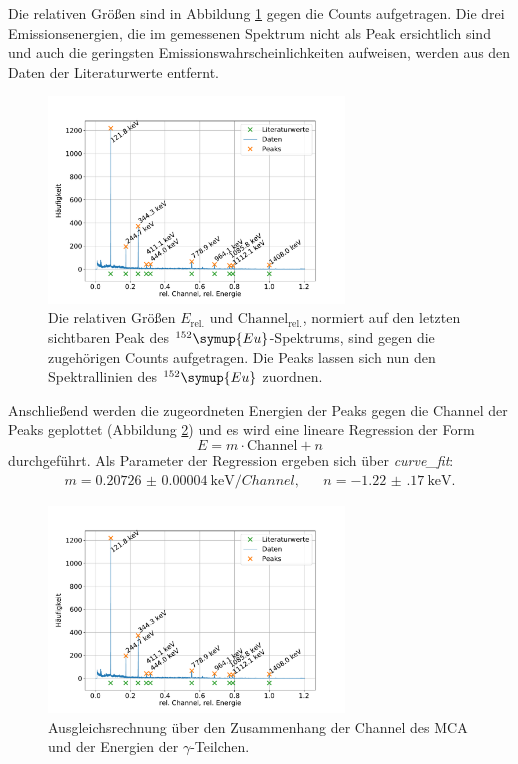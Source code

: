 Die relativen Größen sind in Abbildung \ref{fig:eu_kalibration} gegen die Counts aufgetragen.
Die drei Emissionsenergien, die im gemessenen Spektrum nicht als Peak ersichtlich sind und auch die geringsten Emissionswahrscheinlichkeiten aufweisen, werden aus den Daten der Literaturwerte entfernt.
\begin{figure}[h!]
  \centering
  \includegraphics[width=0.7\textwidth]{content/images/spektrum_europium_kali.pdf}
  \caption{Die relativen Größen $E_{\text{rel.}}$ und $\text{Channel}_{\text{rel.}}$, normiert auf den letzten sichtbaren Peak des $^{152}\symup{Eu}$-Spektrums, sind gegen die zugehörigen Counts aufgetragen.
  Die Peaks lassen sich nun den Spektrallinien des $^{152}\symup{Eu}$ zuordnen.}
  \label{fig:eu_kalibration}
\end{figure}
Anschließend werden die zugeordneten Energien der Peaks gegen die Channel der Peaks geplottet (Abbildung \ref{fig:kalibration}) und es wird eine lineare Regression der Form
\begin{equation}
	E = m \cdot \text{Channel} + n
\end{equation}
durchgeführt.
Als Parameter der Regression ergeben sich über \textit{curve\_fit}:
\begin{align*}
	m = \SI{0.20726(4)}{\kilo \electronvolt \per Channel}, && n = \SI{-1.22(17)}{\kilo \electronvolt}.
\end{align*}
\begin{figure}[h!]
  \centering
  \includegraphics[width=0.7\textwidth]{content/images/spektrum_europium_kali.pdf}
  \caption{Ausgleichsrechnung über den Zusammenhang der Channel des MCA und der Energien der $\gamma$-Teilchen.}
  \label{fig:kalibration}
\end{figure}


